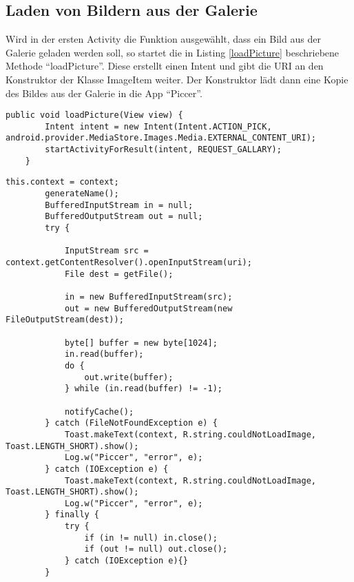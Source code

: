 \subsection{Laden von Bildern aus der Galerie}
Wird in der ersten Activity die Funktion ausgewählt, dass ein Bild aus der Galerie geladen werden soll, so startet die in Listing \ref{loadPicture} beschriebene Methode \enquote{loadPicture}. Diese erstellt einen Intent und gibt die URI an den Konstruktor der Klasse ImageItem weiter. Der Konstruktor lädt dann eine Kopie des Bildes aus der Galerie in die App \enquote{Piccer}.
\begin{lstlisting}[caption={Klasse Piccer: Laden von Bildern aus der Galerie}, label=loadPicture]
    public void loadPicture(View view) {
        Intent intent = new Intent(Intent.ACTION_PICK, android.provider.MediaStore.Images.Media.EXTERNAL_CONTENT_URI);
        startActivityForResult(intent, REQUEST_GALLARY);
    }
\end{lstlisting}
\begin{lstlisting}[caption={Klasse ImageItem: Laden von Bildern aus der Galerie}, label=loadPicture2]
 this.context = context;
        generateName();
        BufferedInputStream in = null;
        BufferedOutputStream out = null;
        try {

            InputStream src = context.getContentResolver().openInputStream(uri);
            File dest = getFile();

            in = new BufferedInputStream(src);
            out = new BufferedOutputStream(new FileOutputStream(dest));

            byte[] buffer = new byte[1024];
            in.read(buffer);
            do {
                out.write(buffer);
            } while (in.read(buffer) != -1);

            notifyCache();
        } catch (FileNotFoundException e) {
            Toast.makeText(context, R.string.couldNotLoadImage, Toast.LENGTH_SHORT).show();
            Log.w("Piccer", "error", e);
        } catch (IOException e) {
            Toast.makeText(context, R.string.couldNotLoadImage, Toast.LENGTH_SHORT).show();
            Log.w("Piccer", "error", e);
        } finally {
            try {
                if (in != null) in.close();
                if (out != null) out.close();
            } catch (IOException e){}
        }
\end{lstlisting}


